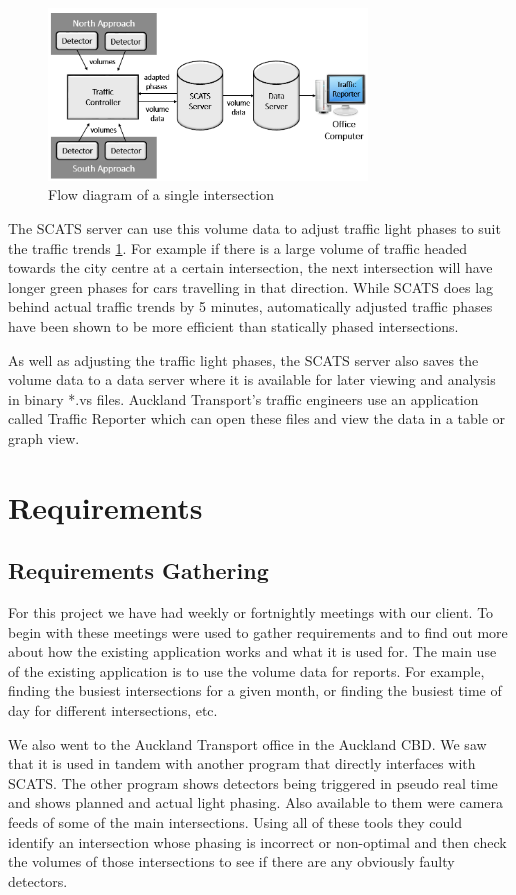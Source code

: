 \documentclass{article}
\begin{document}
\begin{figure}[!t]
\centerline{\includegraphics[height=1.8in]{background}}
\caption{Flow diagram of a single intersection}
\label{fig:background}
\end{figure}

The SCATS server can use this volume data to adjust traffic light phases to suit the traffic trends \ref{fig:background}. For example if there is a large volume of traffic headed towards the city centre at a certain intersection, the next intersection will have longer green phases for cars travelling in that direction. While SCATS does lag behind actual traffic trends by 5 minutes, automatically adjusted traffic phases have been shown to be more efficient than statically phased intersections.

As well as adjusting the traffic light phases, the SCATS server also saves the volume data to a data server where it is available for later viewing and analysis in binary *.vs files. Auckland Transport's traffic engineers use an application called Traffic Reporter which can open these files and view the data in a table or graph view.



\section{Requirements}
\subsection{Requirements Gathering}
For this project we have had weekly or fortnightly
meetings with our client. To begin with these meetings were
used to gather requirements and to find out more about how
the existing application works and what it is used for.
The main use of the existing application is to use the
volume data for reports. For example, finding the busiest
intersections for a given month, or finding the busiest time of
day for different intersections, etc.

We also went to the Auckland Transport office in the
Auckland CBD. We saw that it is used in tandem with another
program that directly interfaces with SCATS. The other
program shows detectors being triggered in pseudo real time
and shows planned and actual light phasing. Also available to
them were camera feeds of some of the main intersections.
Using all of these tools they could identify an intersection
whose phasing is incorrect or non-optimal and then check the
volumes of those intersections to see if there are any obviously
faulty detectors.
\end{document}
